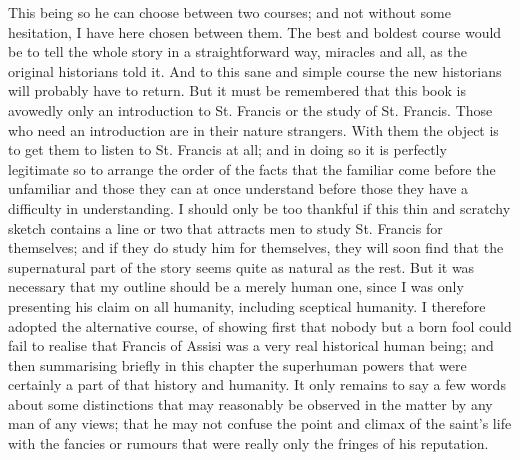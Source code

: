 \documentclass{book}
\begin{document}
This being so he can choose between two courses; and not without some hesitation, I have here chosen between them. The best and boldest course would be to tell the whole story in a straightforward way, miracles and all, as the original historians told it. And to this sane and simple course the new historians will probably have to return. But it must be remembered that this book is avowedly only an introduction to St. Francis or the study of St. Francis. Those who need an introduction are in their nature strangers. With them the object is to get them to listen to St. Francis at all; and in doing so it is perfectly legitimate so to arrange the order of the facts that the familiar come before the unfamiliar and those they can at once understand before those they have a difficulty in understanding. I should only be too thankful if this thin and scratchy sketch contains a line or two that attracts men to study St. Francis for themselves; and if they do study him for themselves, they will soon find that the supernatural part of the story seems quite as natural as the rest. But it was necessary that my outline should be a merely human one, since I was only presenting his claim on all humanity, including sceptical humanity. I therefore adopted the alternative course, of showing first that nobody but a born fool could fail to realise that Francis of Assisi was a very real historical human being; and then summarising briefly in this chapter the superhuman powers that were certainly a part of that history and humanity. It only remains to say a few words about some distinctions that may reasonably be observed in the matter by any man of any views; that he may not confuse the point and climax of the saint’s life with the fancies or rumours that were really only the fringes of his reputation.
\end{document}
